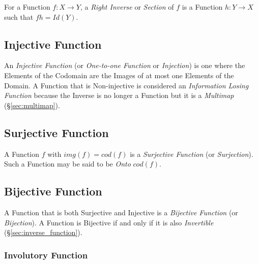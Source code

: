 For a Function $f: X \rightarrow Y$, a \emph{Right Inverse} or
\emph{Section} of $f$ is a Function $h: Y \rightarrow X$ such that $fh
= Id(Y)$.



\subsection{Injective Function}\label{sec:injective_function}

An \emph{Injective Function} (or \emph{One-to-one Function} or
\emph{Injection}) is one where the Elements of the Codomain are the
Images of at most one Elements of the Domain. A Function that is
Non-injective is considered an \emph{Information Losing Function}
because the Inverse is no longer a Function but it is a
\emph{Multimap} (\S\ref{sec:multimap}).



\subsection{Surjective Function}\label{sec:surjective_function}

A Function $f$ with $img(f) = cod(f)$ is a \emph{Surjective Function}
(or \emph{Surjection}). Such a Function may be said to be \emph{Onto}
$cod(f)$.



\subsection{Bijective Function}\label{sec:bijective_function}

A Function that is both Surjective and Injective is a \emph{Bijective
  Function} (or \emph{Bijection}). A Function is Bijective if and only
if it is also \emph{Invertible} (\S\ref{sec:inverse_function}).



\subsubsection{Involutory Function}\label{sec:involution}

